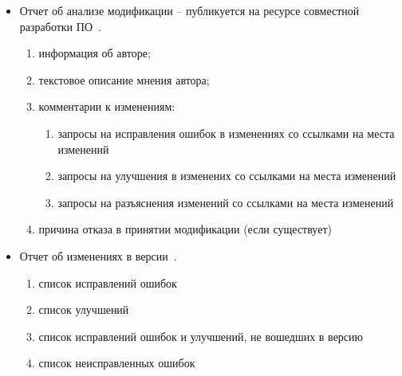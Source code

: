\begin{itemize}
    \item Отчет об анализе модификации -- публикуется на ресурсе совместной разработки ПО~\cite{qemupatchew}.
    \begin{enumerate}
        \item информация об авторе;
        \item текстовое описание мнения автора;
        \item комментарии к изменениям:
        \begin{enumerate}
            \item запросы на исправления ошибок в изменениях со ссылками на места изменений
            \item запросы на улучшения в изменених со ссылками на места изменений
            \item запросы на разъяснения изменений со ссылками на места изменений
        \end{enumerate}
        \item причина отказа в принятии модификации (если существует)
    \end{enumerate}


    \item Отчет об изменениях в версии~\cite{qemu}.
    \begin{enumerate}
        \item список исправлений ошибок
        \item список улучшений
        \item список исправлений ошибок и улучшений, не вошедших в версию
        \item список неисправленных ошибок
    \end{enumerate}
\end{itemize}

